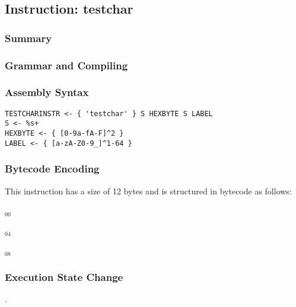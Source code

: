 \subsection{Instruction: testchar}

\subsubsection{Summary}


\subsubsection{Grammar and Compiling}


\subsubsection{Assembly Syntax}

\begin{myquote}
\begin{verbatim}
TESTCHARINSTR <- { 'testchar' } S HEXBYTE S LABEL
S <- %s+
HEXBYTE <- { [0-9a-fA-F]^2 }
LABEL <- { [a-zA-Z0-9_]^1-64 }
\end{verbatim}
\end{myquote}


\subsubsection{Bytecode Encoding}

This instruction has a size of 12 bytes and is structured in bytecode as follows:

$_{00}$\ 



$_{04}$\ 



$_{08}$\ 
\fbox{%
  \parbox{20pt}{%
00
  }%
}


\subsubsection{Execution State Change}

.


